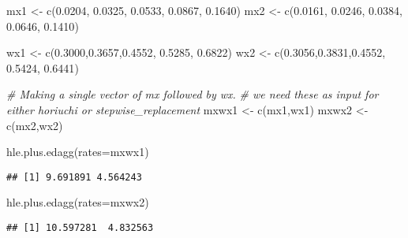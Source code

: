 \documentclass[
]{article}
\newenvironment{Shaded}{\begin{snugshade}}{\end{snugshade}}
\newcommand{\AttributeTok}[1]{\textcolor[rgb]{0.77,0.63,0.00}{#1}}
\newcommand{\CommentTok}[1]{\textcolor[rgb]{0.56,0.35,0.01}{\textit{#1}}}
\newcommand{\FloatTok}[1]{\textcolor[rgb]{0.00,0.00,0.81}{#1}}
\newcommand{\FunctionTok}[1]{\textcolor[rgb]{0.00,0.00,0.00}{#1}}
\newcommand{\NormalTok}[1]{#1}
\newcommand{\OtherTok}[1]{\textcolor[rgb]{0.56,0.35,0.01}{#1}}
\begin{document}
\begin{Shaded}
\begin{Highlighting}[]
\NormalTok{mx1 }\OtherTok{\textless{}{-}} \FunctionTok{c}\NormalTok{(}\FloatTok{0.0204}\NormalTok{, }\FloatTok{0.0325}\NormalTok{, }\FloatTok{0.0533}\NormalTok{, }\FloatTok{0.0867}\NormalTok{,}
         \FloatTok{0.1640}\NormalTok{)}
\NormalTok{mx2 }\OtherTok{\textless{}{-}} \FunctionTok{c}\NormalTok{(}\FloatTok{0.0161}\NormalTok{, }\FloatTok{0.0246}\NormalTok{, }\FloatTok{0.0384}\NormalTok{, }\FloatTok{0.0646}\NormalTok{,}
         \FloatTok{0.1410}\NormalTok{)}


\NormalTok{wx1 }\OtherTok{\textless{}{-}} \FunctionTok{c}\NormalTok{(}\FloatTok{0.3000}\NormalTok{,}\FloatTok{0.3657}\NormalTok{,}\FloatTok{0.4552}\NormalTok{, }\FloatTok{0.5285}\NormalTok{,}
         \FloatTok{0.6822}\NormalTok{)}
\NormalTok{wx2 }\OtherTok{\textless{}{-}} \FunctionTok{c}\NormalTok{(}\FloatTok{0.3056}\NormalTok{,}\FloatTok{0.3831}\NormalTok{,}\FloatTok{0.4552}\NormalTok{, }\FloatTok{0.5424}\NormalTok{,}
         \FloatTok{0.6441}\NormalTok{)}


\CommentTok{\# Making a single vector of mx followed by wx.}
\CommentTok{\# we need these as input for either horiuchi or stepwise\_replacement}
\NormalTok{mxwx1 }\OtherTok{\textless{}{-}} \FunctionTok{c}\NormalTok{(mx1,wx1)}
\NormalTok{mxwx2 }\OtherTok{\textless{}{-}} \FunctionTok{c}\NormalTok{(mx2,wx2)}

\FunctionTok{hle.plus.edagg}\NormalTok{(}\AttributeTok{rates=}\NormalTok{mxwx1)}
\end{Highlighting}
\end{Shaded}

\begin{verbatim}
## [1] 9.691891 4.564243
\end{verbatim}

\begin{Shaded}
\begin{Highlighting}[]
\FunctionTok{hle.plus.edagg}\NormalTok{(}\AttributeTok{rates=}\NormalTok{mxwx2)}
\end{Highlighting}
\end{Shaded}

\begin{verbatim}
## [1] 10.597281  4.832563
\end{verbatim}
\end{document}

